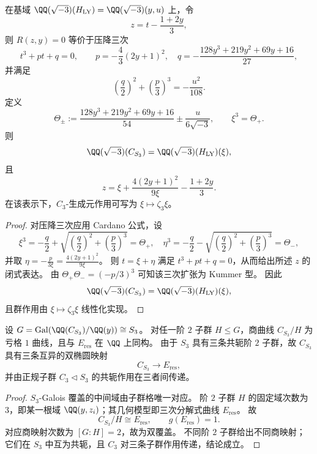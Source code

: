\begin{conclusion}\label{con:cdim-s4-v4-cardano-kummer-explicit}
在基域 \(\QQ(\sqrt{-3})(H_{\mathrm{LY}})=\QQ(\sqrt{-3})(y,u)\) 上，令
\[
z=t-\frac{1+2y}{3},
\]
则 \(R(z,y)=0\) 等价于压降三次
\[
t^{3}+pt+q=0,
\qquad
p=-\frac{4}{3}(2y+1)^{2},\quad
q=-\frac{128y^{3}+219y^{2}+69y+16}{27},
\]
并满足
\[
\left(\frac{q}{2}\right)^2+\left(\frac{p}{3}\right)^3=-\frac{u^{2}}{108}.
\]
定义
\[
\Theta_{\pm}
:=
\frac{128y^{3}+219y^{2}+69y+16}{54}
\pm
\frac{u}{6\sqrt{-3}},
\qquad
\xi^{3}=\Theta_{+}.
\]
则
\[
\QQ(\sqrt{-3})(C_{S_3})
=
\QQ(\sqrt{-3})(H_{\mathrm{LY}})(\xi),
\]
且
\[
z=\xi+\frac{4(2y+1)^2}{9\xi}-\frac{1+2y}{3}.
\]
在该表示下，\(C_3\)-生成元作用可写为 \(\xi\mapsto \zeta_3\xi\)。
\end{conclusion}
\begin{proof}
对压降三次应用 Cardano 公式，设
\[
\xi^{3}=-\frac{q}{2}+\sqrt{\left(\frac{q}{2}\right)^2+\left(\frac{p}{3}\right)^3}=\Theta_{+},
\quad
\eta^{3}=-\frac{q}{2}-\sqrt{\left(\frac{q}{2}\right)^2+\left(\frac{p}{3}\right)^3}=\Theta_{-},
\]
并取 \(\eta=-\frac{p}{3\xi}=\frac{4(2y+1)^2}{9\xi}\)。
则 \(t=\xi+\eta\) 满足 \(t^3+pt+q=0\)，从而给出所述 \(z\) 的闭式表达。
由 \(\Theta_{+}\Theta_{-}=(-p/3)^3\) 可知该三次扩张为 Kummer 型。
因此
\[
\QQ(\sqrt{-3})(C_{S_3})=\QQ(\sqrt{-3})(H_{\mathrm{LY}})(\xi),
\]
且群作用由 \(\xi\mapsto\zeta_3\xi\) 线性化实现。
\end{proof}

\begin{conclusion}[三重双椭圆结构与同构椭圆商]\label{con:cdim-s4-v4-triple-bielliptic}
设 \(G=\mathrm{Gal}(\QQ(C_{S_3})/\QQ(y))\cong S_3\)。
对任一阶 \(2\) 子群 \(H\le G\)，商曲线 \(C_{S_3}/H\) 为亏格 \(1\) 曲线，且与 \(E_{\mathrm{res}}\) 在 \(\QQ\) 上同构。
由于 \(S_3\) 具有三条共轭阶 \(2\) 子群，故 \(C_{S_3}\) 具有三条互异的双椭圆映射
\[
C_{S_3}\longrightarrow E_{\mathrm{res}},
\]
并由正规子群 \(C_3\triangleleft S_3\) 的共轭作用在三者间传递。
\end{conclusion}
\begin{proof}
\(S_3\)-Galois 覆盖的中间域由子群格唯一对应。
阶 \(2\) 子群 \(H\) 的固定域次数为 \(3\)，即某一根域 \(\QQ(y,z_i)\)；其几何模型即三次分解式曲线 \(E_{\mathrm{res}}\)。
故
\[
C_{S_3}/H\cong E_{\mathrm{res}},\qquad g(E_{\mathrm{res}})=1.
\]
对应商映射次数为 \([G:H]=2\)，故为双覆盖。
不同阶 \(2\) 子群给出不同商映射；它们在 \(S_3\) 中互为共轭，且 \(C_3\) 对三条子群作用传递，结论成立。
\end{proof}

